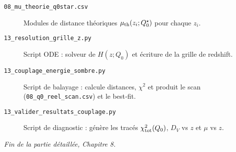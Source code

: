 \begin{description}
  \item[\texttt{08\_mu\_theorie\_q0star.csv}] Modules de distance théoriques \(\mu_{\rm th}(z_{i};Q_{0}^{\star})\) pour chaque \(z_{i}\).
  \item[\texttt{13\_resolution\_grille\_z.py}] Script ODE : solveur de \(H(z;Q_{0})\) et écriture de la grille de redshift.
  \item[\texttt{13\_couplage\_energie\_sombre.py}] Script de balayage : calcule distances, \(\chi^{2}\) et produit le scan (\texttt{08\_q0\_reel\_scan.csv}) et le best‐fit.
  \item[\texttt{13\_valider\_resultats\_couplage.py}] Script de diagnostic : génère les tracés \(\chi^{2}_{\rm tot}(Q_{0})\), \(D_{V}\) vs \(z\) et \(\mu\) vs \(z\).
\end{description}

\bigskip
\noindent\emph{Fin de la partie détaillée, Chapitre 8.}
